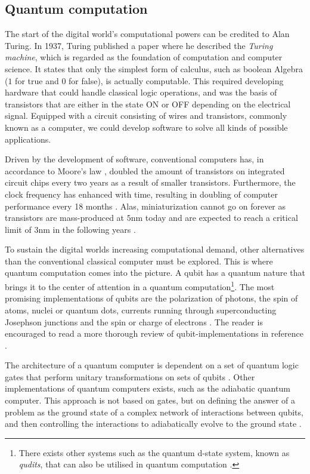 \subsection{Quantum computation}
The start of the digital world's computational powers can be credited to Alan Turing. In 1937, Turing \cite{Turing1937} published a paper where he described the \textit{Turing machine}, which is regarded as the foundation of computation and computer science. It states that only the simplest form of calculus, such as boolean Algebra ($1$ for true and $0$ for false), is actually computable. This required developing hardware that could handle classical logic operations, and was the basis of transistors that are either in the state ON or OFF depending on the electrical signal. Equipped with a circuit consisting of wires and transistors, commonly known as a computer, we could develop software to solve all kinds of possible applications.

Driven by the development of software, conventional computers has, in accordance to Moore's law \cite{Moore1965}, doubled the amount of transistors on integrated circuit chips every two years as a result of smaller transistors. Furthermore, the clock frequency has enhanced with time, resulting in doubling of computer performance every 18 months \cite{Pavicic2006}. Alas, miniaturization cannot go on forever as transistors are mass-produced at $5$nm today and are expected to reach a critical limit of $3$nm in the following years \cite{Gwennap2020}.

To sustain the digital worlds increasing computational demand, other alternatives than the conventional classical computer must be explored. This is where quantum computation comes into the picture. A qubit has a quantum nature that brings it to the center of attention in a quantum computation\footnote{There exists other systems such as the quantum d-state system, known as \textit{qudits}, that can also be utilised in quantum computation \cite{Ladd2010}.}. The most promising implementations of qubits are the polarization of photons, the spin of atoms, nuclei or quantum dots, currents running through superconducting Josephson junctions and the spin or charge of electrons \cite{Bathen2020}. The reader is encouraged to read a more thorough review of qubit-implementations in reference \cite{Acin2018}.

The architecture of a quantum computer is dependent on a set of quantum logic gates that perform unitary transformations on sets of qubits \cite{DiVincenzo2000, Ladd2010}. Other implementations of quantum computers exists, such as the adiabatic quantum computer. This approach is not based on gates, but on defining the answer of a problem as the ground state of a complex network of interactions between qubits, and then controlling the interactions to adiabatically evolve to the ground state \cite{Mizel2007}.

